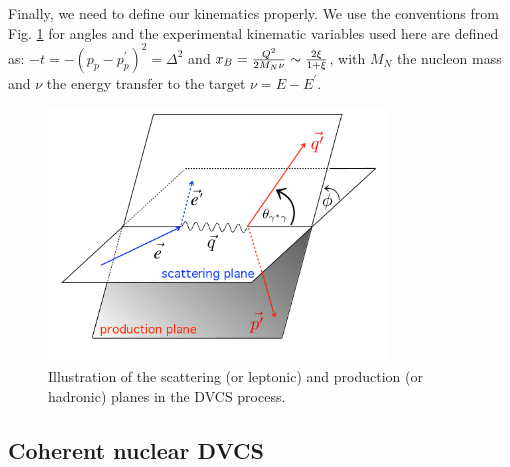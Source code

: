 \documentclass[aps,prc,preprint,superscriptaddress]{revtex4}
\begin{document}
Finally, we need to define our kinematics properly. We use the 
conventions from Fig. \ref{fig:PhiAngle} for angles and the experimental kinematic variables
used here are defined as: 
$-t = -(p_p-p_p^\prime)^2 = \Delta^2$ and 
$x_B = {Q^2 \over 2 M_N \nu}\sim {2\xi \over 1+\xi}$, with $M_N$ the nucleon mass and $\nu$ the
energy transfer to the target $\nu = {E -E^\prime} $. 

\begin{figure}[tbp!]
\center
\includegraphics[width=9cm]{fig1/finalplane.png}
	\caption{Illustration of the scattering (or leptonic) and production (or hadronic) planes
	in the DVCS process.} 
\label{fig:PhiAngle}
\end{figure}



\subsection{Coherent nuclear DVCS}
\end{document}
